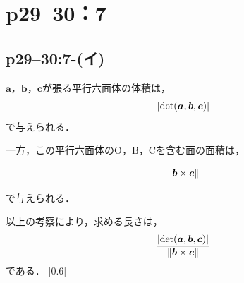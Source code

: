 \documentclass[a4paper,10pt,fleqn]{ltjsarticle}
\begin{document}
\newpage

\section*{p29--30：7}

\subsection*{p29--30:7-(イ)}

\begin{tleftbar}
    $\bm{a}$，$\bm{b}$，$\bm{c}$が張る平行六面体の体積は，
    \[
        \abs{\det (\bm{a},\bm{b},\bm{c})}
    \]
    で与えられる．

    一方，この平行六面体の$\mathrm{O}$，$\mathrm{B}$，$\mathrm{C}$を含む面の面積は，

    \[
        \norm{\bm{b} \times \bm{c}}
    \]

    で与えられる．

    以上の考察により，求める長さは，
    \[
        \frac{\abs{\det(\bm{a},\bm{b},\bm{c})}}{\norm{\bm{b} \times \bm{c}}}
    \]
    である．
    \scalebox{0.6}[0.6]{
        \begin{tikzpicture}[x=0.75pt,y=0.75pt,yscale=-1,xscale=1]


\end{tikzpicture}}
\end{tleftbar}
\end{document}
